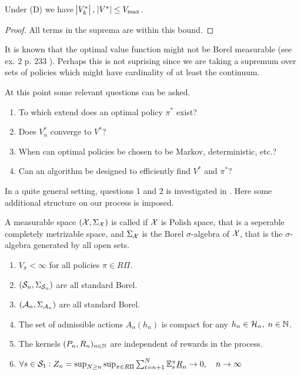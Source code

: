 \begin{prop} Under (D) we have
  $\abs{V^*_k},\; \abs{V^*} \leq V_{\max}$.
\end{prop}
\begin{proof}
  All terms in the suprema are within this bound.
\end{proof}

\begin{rem}
It is known that the optimal value function
might not be Borel measurable (see ex. 2 p. 233 ).
Perhaps this is not suprising since we are taking a supremum over
sets of policies which might have cardinality of at least the continuum.
\end{rem}

At this point some relevant questions can be asked.
\begin{enumerate}
  \item To which extend does an optimal policy $\pi^*$ exist?
  \item Does $V_n^*$ converge to $V^*$?
  \item When can optimal policies be chosen to be Markov, deterministic, etc.?
  \item Can an algorithm be designed to efficiently find $V^*$ and
    $\pi^*$?
\end{enumerate}

In a quite general setting, questions 1 and 2
is investigated in .
Here some additional structure on our process is imposed.
\begin{defn}
  A measurable space $(\mathcal{X}, \Sigma_\mathcal{X})$ is called
   if $\mathcal{X}$ is Polish space, that is a
  seperable completely metrizable space, and $\Sigma_\mathcal{X}$ is
  the Borel $\sigma$-algebra of $\mathcal{X}$, that is the $\sigma$-algebra
  generated by all open sets.
  \label{defn:standardBorelp}
\end{defn}
\begin{sett}[Schäl]
  \leavevmode
  \begin{enumerate}
    \item $V_\pi < \infty$ for all policies $\pi \in R\Pi$.
    \item $(\mathcal{S}_n, \Sigma_{\mathcal{S}_n})$ are all standard Borel.
    \item $(\mathcal{A}_n, \Sigma_{\mathcal{A}_n})$ are all standard Borel.
    \item The set of admissible actions
      $A_n(h_n)$ is compact for any $h_n \in \mathcal{H}_n, \; n \in \mathbb{N}$.
    \item The kernels $(P_n, R_n)_{n \in \mathbb{N}}$ are independent of 
      rewards in the process.
    \item 
      $ \forall s \in \mathcal{S}_1 :
	Z_n = \sup_{N \geq n} \sup_{\pi \in R\Pi} \sum_{t=n+1}^N
      \mathbb{E}_s^\pi \underline{R}_n \to 0, \quad n \to \infty $
  \end{enumerate}
  \label{sett:Schal}
\end{sett}

